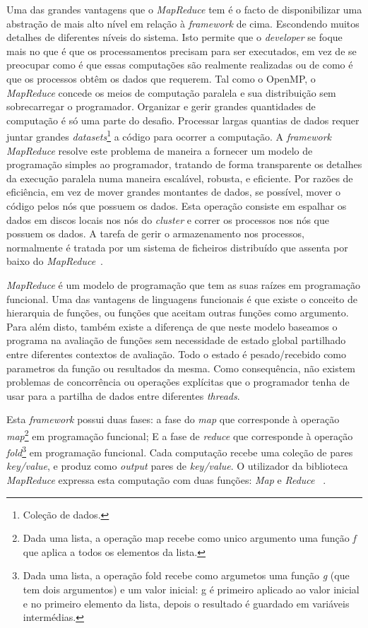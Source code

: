 Uma das grandes vantagens que o \textit{MapReduce} tem é o facto de disponibilizar uma abstração de mais alto nível em relação à \textit{framework} de cima. Escondendo muitos detalhes de diferentes níveis do sistema. Isto permite que o \textit{developer} se foque mais no que é que os processamentos precisam para ser executados, em vez de se preocupar como é que essas computações são realmente realizadas ou de como é que os processos obtêm os dados que requerem. Tal como o OpenMP, o \textit{MapReduce} concede os meios de computação paralela e sua distribuição sem sobrecarregar o programador. Organizar e gerir grandes quantidades de computação é só uma parte do desafio. Processar largas quantias de dados requer juntar grandes \textit{datasets}\footnote{Coleção de dados.} a código para ocorrer a computação. A \textit{framework} \textit{MapReduce} resolve este problema de maneira a fornecer um modelo de programação simples ao programador, tratando de forma transparente os detalhes da execução paralela numa maneira escalável, robusta, e eficiente. Por razões de eficiência, em vez de mover grandes montantes de dados, se possível, mover o código pelos nós que possuem os dados. Esta operação consiste em espalhar os dados em discos locais nos nós do \textit{cluster} e correr os processos nos nós que possuem os dados. A tarefa de gerir o armazenamento nos processos, normalmente é tratada por um sistema de ficheiros distribuído que assenta por baixo do \textit{MapReduce}~\cite{lin2010data}.

\textit{MapReduce} é um modelo de programação que tem as suas raízes em programação funcional. Uma das vantagens de linguagens funcionais é que existe o conceito de hierarquia de funções, ou funções que aceitam outras funções como argumento. Para além disto, também existe a diferença de que neste modelo baseamos o programa na avaliação de funções sem necessidade de estado global partilhado entre diferentes contextos de avaliação. Todo o estado é pesado/recebido como parametros da função ou resultados da mesma. Como consequência, não existem problemas de concorrência ou operações explícitas que o programador tenha de usar para a partilha de dados entre diferentes \textit{threads}.

Esta \textit{framework} possui duas fases: a fase do \textit{map} que corresponde à operação \textit{map}\footnote{Dada uma lista, a operação map recebe como unico argumento uma função \textit{f} que aplica a todos os elementos da lista.} em programação funcional; E a fase de \textit{reduce} que corresponde à operação \textit{fold}\footnote{Dada uma lista, a operação fold recebe como argumetos uma função \textit{g} (que tem dois argumentos) e um valor inicial: g é primeiro aplicado ao valor inicial e no primeiro elemento da lista, depois o resultado é guardado em variáveis intermédias.} em programação funcional. Cada computação recebe uma coleção de pares \textit{key/value}, e produz como \textit{output} pares de \textit{key/value}. O utilizador da biblioteca \textit{MapReduce} expressa esta computação com duas funções: \textit{Map} e \textit{Reduce} ~\cite{lin2010data}.

